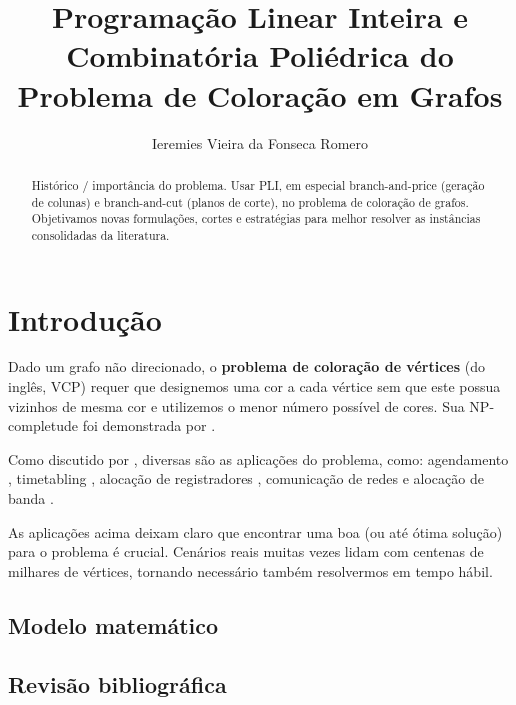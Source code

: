 \documentclass[11pt]{article}
\author{Ieremies Vieira da Fonseca Romero}
\date{}
\title{Programação Linear Inteira e Combinatória Poliédrica do Problema de Coloração em Grafos}
\begin{document}
\maketitle
\begin{abstract}
Histórico / importância do problema.
Usar PLI, em especial branch-and-price (geração de colunas) e branch-and-cut (planos de corte), no problema de coloração de grafos.
Objetivamos novas formulações, cortes e estratégias para melhor resolver as instâncias consolidadas da literatura.
\end{abstract}

\section{Introdução}
\label{sec:org3b390cb}
Dado um grafo não direcionado, o \textbf{problema de coloração de vértices} (do inglês, VCP) requer que designemos uma cor a cada vértice sem que este possua vizinhos de mesma cor e utilizemos o menor número possível de cores.
Sua NP-completude foi demonstrada por \textcite{Garey1979ComputersIntractabilityGuide}.

Como discutido por \autocite{Malaguti2010SurveyVertexColoring}, diversas são as aplicações do problema, como: agendamento \autocite{Leighton1979GraphColoringAlgorithm}, timetabling \autocite{Werra1985introductiontimetabling}, alocação de registradores \autocite{Chow1990prioritybasedcoloring}, comunicação de redes \autocite{Caprara2007PassengerRailwayOptimization} e alocação de banda \autocite{Gamst1986Somelowerbounds}.

As aplicações acima deixam claro que encontrar uma boa (ou até ótima solução) para o problema é crucial. Cenários reais muitas vezes lidam com centenas de milhares de vértices, tornando necessário também resolvermos em tempo hábil. 

\subsection{Modelo matemático}
\label{sec:orgf87b736}
\subsection{Revisão bibliográfica}
\label{sec:org9896070}
\end{document}
